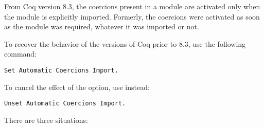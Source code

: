 
From Coq version 8.3, the coercions present in a module are activated
only when the module is explicitly imported. Formerly, the coercions
were activated as soon as the module was required, whatever it was
imported or not.

To recover the behavior of the versions of Coq prior to 8.3, use the
following command:

\begin{verbatim}
Set Automatic Coercions Import.
\end{verbatim}

To cancel the effect of the option, use instead:

\begin{verbatim}
Unset Automatic Coercions Import.
\end{verbatim}


  There are three situations:

